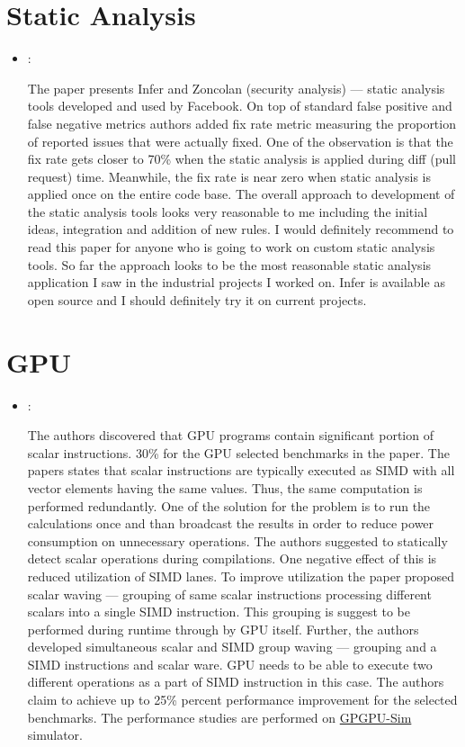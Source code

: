 \section*{Static Analysis}
\begin{itemize}
    \item \cite{Distefano:StaticAnalysisFB:2019}:

    The paper presents Infer and Zoncolan (security analysis) --- static analysis tools developed and used by Facebook. On top of standard false positive and false negative metrics authors added fix rate metric measuring the proportion of reported issues that were actually fixed. One of the observation is that the fix rate gets closer to 70\% when the static analysis is applied during diff (pull request) time. Meanwhile, the fix rate is near zero when static analysis is applied once on the entire code base. The overall approach to development of the static analysis tools looks very reasonable to me including the initial ideas, integration and addition of new rules. I would definitely recommend to read this paper for anyone who is going to work on custom static analysis tools. So far the approach looks to be the most reasonable static analysis application I saw in the industrial projects I worked on. Infer is available as open source and I should definitely try it on current projects.
\end{itemize}

\section*{GPU}
\begin{itemize}
    \item \cite{Yilmazer:ScalarWaving:2014}:

    The authors discovered that GPU programs contain significant portion of scalar instructions. 30\% for the GPU selected benchmarks in the paper. The papers states that scalar instructions are typically executed as SIMD with all vector elements having the same values. Thus, the same computation is performed redundantly. One of the solution for the problem is to run the calculations once and than broadcast the results in order to reduce power consumption on unnecessary operations. The authors suggested to statically detect scalar operations during compilations. One negative effect of this is reduced utilization of SIMD lanes. To improve utilization the  paper proposed scalar waving --- grouping of same scalar instructions processing different scalars into a single SIMD instruction. This grouping is suggest to be performed during runtime through by GPU itself. Further, the authors developed simultaneous scalar and SIMD group waving --- grouping and a SIMD instructions and scalar ware. GPU needs to be able to execute two different operations as a part of SIMD instruction in this case. The authors claim to achieve up to 25\% percent performance improvement for the selected benchmarks. The performance studies are performed on \href{https://github.com/gpgpu-sim}{GPGPU-Sim} simulator.
\end{itemize}

